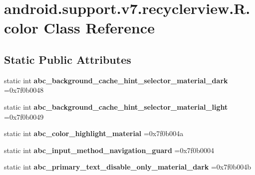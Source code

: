 \hypertarget{classandroid_1_1support_1_1v7_1_1recyclerview_1_1R_1_1color}{}\section{android.\+support.\+v7.\+recyclerview.\+R.\+color Class Reference}
\label{classandroid_1_1support_1_1v7_1_1recyclerview_1_1R_1_1color}
\subsection*{Static Public Attributes}
\begin{DoxyCompactItemize}
\item 
\mbox{\label{classandroid_1_1support_1_1v7_1_1recyclerview_1_1R_1_1color_a5600aeefc00c324bb1bdb949eb00681d}} 
static int {\bfseries abc\+\_\+background\+\_\+cache\+\_\+hint\+\_\+selector\+\_\+material\+\_\+dark} =0x7f0b0048
\item 
\mbox{\label{classandroid_1_1support_1_1v7_1_1recyclerview_1_1R_1_1color_a699ae7b4b79a1fca38478bfc409a9e5f}} 
static int {\bfseries abc\+\_\+background\+\_\+cache\+\_\+hint\+\_\+selector\+\_\+material\+\_\+light} =0x7f0b0049
\item 
\mbox{\label{classandroid_1_1support_1_1v7_1_1recyclerview_1_1R_1_1color_a84e178145fa4ee6af9b80e8aee0a6439}} 
static int {\bfseries abc\+\_\+color\+\_\+highlight\+\_\+material} =0x7f0b004a
\item 
\mbox{\label{classandroid_1_1support_1_1v7_1_1recyclerview_1_1R_1_1color_a7a2778e3588458a8cd6b2232cce03af0}} 
static int {\bfseries abc\+\_\+input\+\_\+method\+\_\+navigation\+\_\+guard} =0x7f0b0004
\item 
\mbox{\label{classandroid_1_1support_1_1v7_1_1recyclerview_1_1R_1_1color_a51ca7a5cc381b38b579bb89c935eeb8c}} 
static int {\bfseries abc\+\_\+primary\+\_\+text\+\_\+disable\+\_\+only\+\_\+material\+\_\+dark} =0x7f0b004b
\item 

\end{DoxyCompactItemize}
